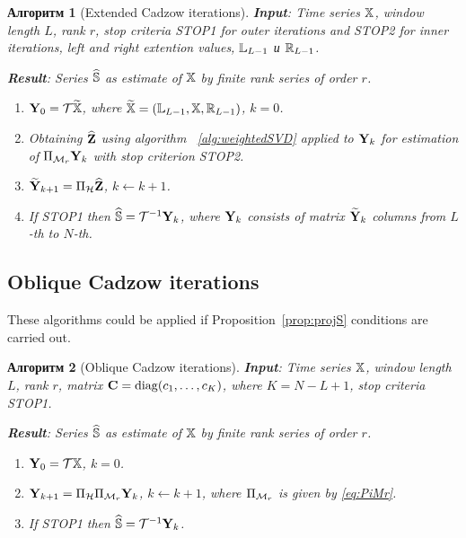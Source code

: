 \documentclass[12pt,a4paper,fleqn,leqno]{article}
\newtheorem{algorithm}{Алгоритм}
\begin{document}
\begin{algorithm}[Extended Cadzow iterations]
\textbf{Input}: Time series $\mathbb{X}$, window length $L$, rank $r$,
stop criteria STOP1 for outer iterations and STOP2 for inner iterations,
left and right extention values, $\mathbb{L}_{L-1}$ и $\mathbb{R}_{L-1}$.

\textbf{Result}:
Series $\widehat{\mathbb{S}}$ as estimate of $\mathbb{X}$ by finite rank series of order $r$.

\begin{enumerate}
\item
$\mathbf{Y}_0 = \mathcal{T} \widetilde{\mathbb{X}}$, where $\widetilde{\mathbb{X}}=(\mathbb{L}_{L-1}, \mathbb{X}, \mathbb{R}_{L-1})$, $k=0$.
\item
Obtaining $\widehat{\mathbf{Z}}$ using algorithm ~\ref{alg:weightedSVD} applied to $\mathbf{Y}_k$ for estimation of $\Pi_{\mathcal{M}_r} \mathbf{Y}_{k}$ with stop criterion STOP2.
\item
$\widetilde{\mathbf{Y}}_{k+1} = \Pi_{\mathcal{H}}  \widehat{\mathbf{Z}}$, $k\leftarrow k+1$.
\item
If STOP1 then $\widehat{\mathbb{S}} = \mathcal{T}^{-1} \mathbf{Y}_k$, where $\mathbf{Y}_k$ consists of matrix $\widetilde{\mathbf{Y}}_{k}$ columns from $L$-th to $N$-th.
\end{enumerate}
\end{algorithm}


\subsection{Oblique Cadzow iterations}

These algorithms could be applied if Proposition~\ref{prop:projS} conditions are carried out.

\begin{algorithm}[Oblique Cadzow iterations]
\label{alg:obliqueCadzow}
\textbf{Input}: Time series $\mathbb{X}$, window length $L$, rank $r$, matrix $\mathbf{C}=\mathop{\mathrm{diag}}(c_1,\ldots, c_K)$, where $K=N-L+1$,
stop criteria STOP1.

\textbf{Result}:
Series $\widehat{\mathbb{S}}$ as estimate of $\mathbb{X}$ by finite rank series of order $r$.

\begin{enumerate}
\item
$\mathbf{Y}_0 = \mathcal{T} \mathbb{X}$, $k=0$.
\item
$\mathbf{Y}_{k+1} = \Pi_{\mathcal{H}}  \Pi_{\mathcal{M}_r} \mathbf{Y}_{k}$, $k\leftarrow k+1$, where
$\Pi_{\mathcal{M}_r}$ is given by \eqref{eq:PiMr}.
\item
If STOP1 then $\widehat{\mathbb{S}} = \mathcal{T}^{-1} \mathbf{Y}_k$.
\end{enumerate}
\end{algorithm}
\end{document}

